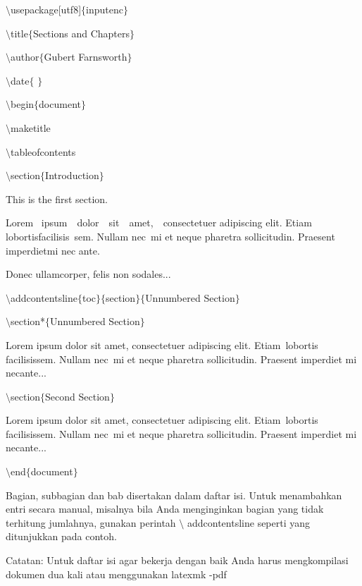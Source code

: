 \begin{itemize}
$\setminus$usepackage[utf8]$ \{ $inputenc$ \} $\par

$\setminus$title$ \{ $Sections and Chapters$ \} $\par

$\setminus$author$ \{ $Gubert Farnsworth$ \} $\par

$\setminus$date$ \{ $ $ \} $\par

$\setminus$begin$ \{ $document$ \} $\par

$\setminus$maketitle\par

$\setminus$tableofcontents\par

$\setminus$section$ \{ $Introduction$ \} $\par

This is the first section.\par

Lorem~ ipsum~~dolor~~sit~~amet,~~consectetuer  adipiscing  elit.   Etiam~ lobortisfacilisis~sem.  Nullam nec~mi et neque pharetra sollicitudin.  Praesent imperdietmi nec ante. \par

Donec ullamcorper, felis non sodales...\par

$\setminus$addcontentsline$ \{ $toc$ \} $$ \{ $section$ \} $$ \{ $Unnumbered Section$ \} $\par

$\setminus$section*$ \{ $Unnumbered Section$ \} $\par

Lorem ipsum dolor sit amet, consectetuer adipiscing elit. Etiam~lobortis facilisissem.  Nullam nec~mi et neque pharetra sollicitudin.  Praesent imperdiet mi necante...\par

$\setminus$section$ \{ $Second Section$ \} $\par

Lorem ipsum dolor sit amet, consectetuer adipiscing elit. Etiam~lobortis facilisissem.  Nullam nec~mi et neque pharetra sollicitudin.  Praesent imperdiet mi necante...\par

$\setminus$end$ \{ $document$ \} $\par
\vspace{\baselineskip}
Bagian, subbagian dan bab disertakan dalam daftar isi. Untuk menambahkan entri secara manual, misalnya bila Anda menginginkan bagian yang tidak terhitung jumlahnya, gunakan perintah $\setminus$ addcontentsline seperti yang ditunjukkan pada contoh.\par
\vspace{\baselineskip}
Catatan: Untuk daftar isi agar bekerja dengan baik Anda harus mengkompilasi dokumen dua kali atau menggunakan latexmk -pdf\par



\end{itemize}
